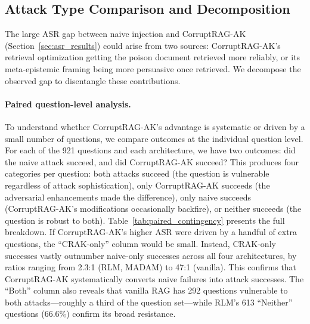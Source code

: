 \documentclass[11pt]{article}
\begin{document}
\subsection{Attack Type Comparison and Decomposition}
\label{sec:decomposition}

The large ASR gap between naive injection and CorruptRAG-AK (Section~\ref{sec:asr_results}) could arise from two sources: CorruptRAG-AK's retrieval optimization getting the poison document retrieved more reliably, or its meta-epistemic framing being more persuasive once retrieved. We decompose the observed gap to disentangle these contributions.

\paragraph{Paired question-level analysis.} To understand whether CorruptRAG-AK's advantage is systematic or driven by a small number of questions, we compare outcomes at the individual question level. For each of the 921 questions and each architecture, we have two outcomes: did the naive attack succeed, and did CorruptRAG-AK succeed? This produces four categories per question: both attacks succeed (the question is vulnerable regardless of attack sophistication), only CorruptRAG-AK succeeds (the adversarial enhancements made the difference), only naive succeeds (CorruptRAG-AK's modifications occasionally backfire), or neither succeeds (the question is robust to both). Table~\ref{tab:paired_contingency} presents the full breakdown. If CorruptRAG-AK's higher ASR were driven by a handful of extra questions, the ``CRAK-only'' column would be small. Instead, CRAK-only successes vastly outnumber naive-only successes across all four architectures, by ratios ranging from 2.3:1 (RLM, MADAM) to 47:1 (vanilla). This confirms that CorruptRAG-AK systematically converts naive failures into attack successes. The ``Both'' column also reveals that vanilla RAG has 292 questions vulnerable to both attacks---roughly a third of the question set---while RLM's 613 ``Neither'' questions (66.6\%) confirm its broad resistance.

\begin{table}[h]
\centering
\caption{Paired question-level attack outcomes. For each architecture and question, we classify whether the naive attack succeeded, CorruptRAG-AK succeeded, both, or neither.}
\label{tab:paired_contingency}
\small

\end{table}
\end{document}
